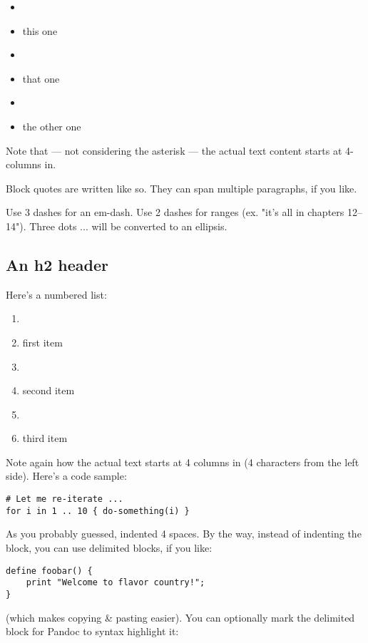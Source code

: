 \begin{itemize}
\item \item this one

\item \item that one

\item \item the other one

\end{itemize}

Note that --- not considering the asterisk --- the actual text
content starts at 4-columns in.

\begin{displayquote}
Block quotes are
written like so.
They can span multiple paragraphs,
if you like.

\end{displayquote}

Use 3 dashes for an em-dash. Use 2 dashes for ranges (ex. "it's all in
chapters 12--14"). Three dots ... will be converted to an ellipsis.
\subsection{An h2 header}
Here's a numbered list:

\begin{enumerate}
\item \item first item

\item \item second item

\item \item third item

\end{enumerate}

Note again how the actual text starts at 4 columns in (4 characters
from the left side). Here's a code sample:

\begin{verbatim}
# Let me re-iterate ...
for i in 1 .. 10 { do-something(i) }
\end{verbatim}
As you probably guessed, indented 4 spaces. By the way, instead of
indenting the block, you can use delimited blocks, if you like:

\begin{verbatim}
define foobar() {
    print "Welcome to flavor country!";
}
\end{verbatim}
(which makes copying & pasting easier). You can optionally mark the
delimited block for Pandoc to syntax highlight it:



